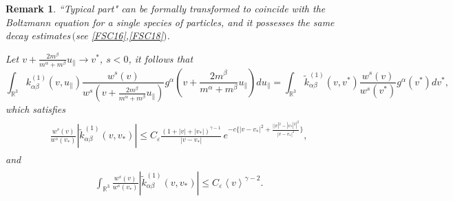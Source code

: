 \documentclass[reqno]{amsart}
\numberwithin{equation}{section}
\newtheorem{remark}[theorem]{Remark}
\numberwithin{equation}{section}
\begin{document}
	\begin{remark}\label{RK2222} 
		``Typical part" can be formally transformed to coincide with the Boltzmann equation for a single species of particles, and it possesses the same decay estimates\,$($see \eqref{FSC16},\eqref{FSC18}$)$. 
		
		Let $v+\frac{2m^{\beta}}{m^{\alpha}+m^{\beta}}u_{\parallel}\rightarrow v^*$, $s<0$, it follows that
		\begin{equation*}
			\int_{\mathbb{R}^3}k_{\alpha \beta}^{(1)}(v,u_{\parallel})\frac{w^s(v)}{w^s(v+\frac{2m^{\beta}}{m^{\alpha}+m^{\beta}}u_{\parallel})}g^{\alpha}(v+\frac{2m^{\beta}}{m^{\alpha}+m^{\beta}}u_{\parallel}) d u_{\parallel}=	\int_{\mathbb{R}^3}\tilde{k}_{\alpha \beta}^{(1)}(v,v^*)\frac{w^s(v)}{w^s(v^*)}g^{\alpha}(v^*) d v^*,
		\end{equation*}
		which satisfies
		\begin{eqnarray}\label{222272}
			\begin{split}
				\frac{w^s(v)}{w^s(v_*)}|\tilde{k}_{\alpha \beta}^{(1)}(v,v_*)|\leq C_{\varepsilon} \frac{(1+|v|+|v_*|)^{\gamma-1}}{|v-v_*|} \, e^{-c\{|v-v_*|^2+\frac{||v|^2-|v_*|^2|^2}{|v-v_*|^2}\}},
			\end{split}
		\end{eqnarray}
		and
		\begin{eqnarray}\label{222273}
			\begin{split}
			\int_{\mathbb{R}^3}	\frac{w^s(v)}{w^s(v_*)}|\tilde{k}_{\alpha \beta}^{(1)}(v,v_*)|\leq C_{\varepsilon} \left \langle v \right\rangle^{\gamma-2}.
			\end{split}
		\end{eqnarray}
	\end{remark}
\end{document}
